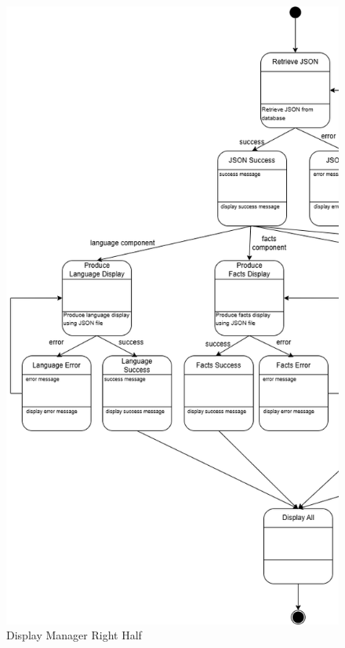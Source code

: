 \begin{figure}[H]
	\centering
	\includegraphics[width=\textwidth, height=\textheight, keepaspectratio]{Section2/images/display_manager_state_diagram_left_half.png}
	\caption{Display Manager Right Half}
	\label{DisplayManager}
\end{figure}

